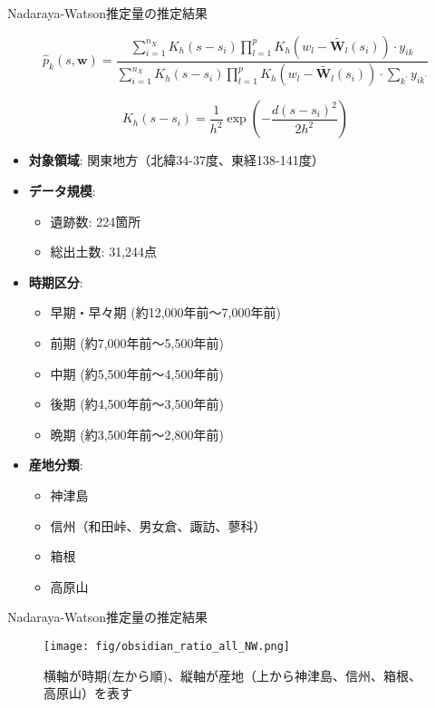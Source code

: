 \documentclass[xelatex, 8pt]{beamer}
\theoremstyle{plain}
\theoremstyle{definition}
\begin{document}
\begin{frame}{Nadaraya-Watson推定量の推定結果}

$$
\hat{p}_k(s, \boldsymbol{w})=\frac{\sum_{i=1}^{n_X} K_h\left(s-s_i\right) \prod_{l=1}^{p}K_h(w_l - \tilde{\boldsymbol{W}_l}(s_i)) \cdot y_{i k}}{\sum_{i=1}^{n_X} K_h\left(s-s_i\right) \prod_{l=1}^{p}K_h(w_l - \tilde{\boldsymbol{W}_l}(s_i))\cdot \sum_{k^{\prime}} y_{i k^{\prime}}}
$$

$$
K_h\left(s-s_i\right)=\frac{1}{h^2} \exp \left(-\frac{d\left(s-s_i\right)^2}{2 h^2}\right)
$$

\begin{itemize}
    \item \textbf{対象領域}: 関東地方（北緯34-37度、東経138-141度）
    \item \textbf{データ規模}:
    \begin{itemize}
        \item 遺跡数: 224箇所
        \item 総出土数: 31,244点
    \end{itemize}
    \vspace{2mm}
    \item \textbf{時期区分}:
    \begin{itemize}
        \item 早期・早々期 (約12,000年前〜7,000年前)
        \item 前期 (約7,000年前〜5,500年前)
        \item 中期 (約5,500年前〜4,500年前)
        \item 後期 (約4,500年前〜3,500年前)
        \item 晩期 (約3,500年前〜2,800年前)
    \end{itemize}
    \vspace{2mm}
    \item \textbf{産地分類}:
    \begin{itemize}
        \item 神津島
        \item 信州（和田峠、男女倉、諏訪、蓼科）
        \item 箱根
        \item 高原山
    \end{itemize}
\end{itemize}

\end{frame}

\begin{frame}{Nadaraya-Watson推定量の推定結果}

\begin{figure}\centering\texttt{[image: fig/obsidian\_ratio\_all\_NW.png]}\caption{横軸が時期(左から順)、縦軸が産地（上から神津島、信州、箱根、高原山）を表す}
\end{figure}

\end{frame}
\end{document}
